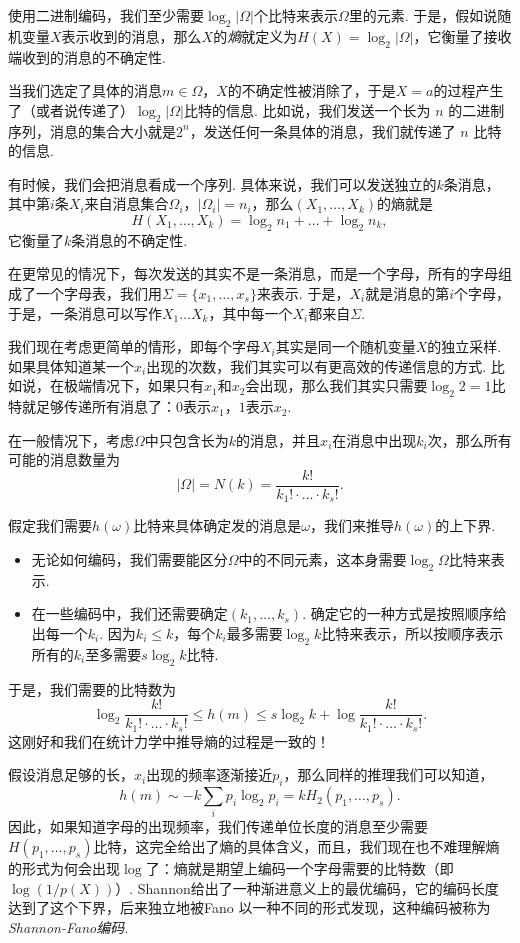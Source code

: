 使用二进制编码，我们至少需要$\log_2 |\Omega|$个比特来表示$\Omega$里的元素. 于是，假如说随机变量$X$表示收到的消息，那么$X$的\textit{熵}就定义为$H(X)=\log_2 |\Omega|$，它衡量了接收端收到的消息的不确定性. 

当我们选定了具体的消息$m\in \Omega$，$X$的不确定性被消除了，于是$X=a$的过程产生了（或者说传递了）$\log_2 |\Omega|$比特的信息. 比如说，我们发送一个长为 $n$ 的二进制序列，消息的集合大小就是$2^n$，发送任何一条具体的消息，我们就传递了 $n$ 比特的信息.

有时候，我们会把消息看成一个序列. 具体来说，我们可以发送独立的$k$条消息，其中第$i$条$X_i$来自消息集合$\Omega_i$，$|\Omega_i|=n_i$，那么$(X_1,\dots,X_k)$的熵就是
\[H(X_1,\dots,X_k)=\log_2 n_1+\dots+\log_2 n_k,\]
它衡量了$k$条消息的不确定性. 

在更常见的情况下，每次发送的其实不是一条消息，而是一个字母，所有的字母组成了一个字母表，我们用$\Sigma=\{x_1,\dots,x_s\}$来表示. 于是，$X_i$就是消息的第$i$个字母，于是，一条消息可以写作$X_1\dots X_k$，其中每一个$X_i$都来自$\Sigma$.

我们现在考虑更简单的情形，即每个字母$X_i$其实是同一个随机变量$X$的独立采样. 如果具体知道某一个$x_i$出现的次数，我们其实可以有更高效的传递信息的方式. 比如说，在极端情况下，如果只有$x_1$和$x_2$会出现，那么我们其实只需要$\log_2 2=1$比特就足够传递所有消息了：$0$表示$x_1$，$1$表示$x_2$.

在一般情况下，考虑$\Omega$中只包含长为$k$的消息，并且$x_i$在消息中出现$k_i$次，那么所有可能的消息数量为
\[|\Omega|=N(k)=\frac{k!}{k_1!\cdot\dots\cdot k_s!}.\]

假定我们需要$h(\omega)$比特来具体确定发的消息是$\omega$，我们来推导$h(\omega)$的上下界. 
\begin{itemize}
    \item 无论如何编码，我们需要能区分$\Omega$中的不同元素，这本身需要$\log_2\Omega$比特来表示. 
    \item 在一些编码中，我们还需要确定$(k_1,\dots,k_s)$. 确定它的一种方式是按照顺序给出每一个$k_i$. 因为$k_i\leq k$，每个$k_i$最多需要$\log_2 k$比特来表示，所以按顺序表示所有的$k_i$至多需要$s\log_2 k$比特.
\end{itemize}
于是，我们需要的比特数为
\[\log_2\frac{k!}{k_1!\cdot\dots\cdot k_s!}\leq h(m)\leq s\log_2k+\log\frac{k!}{k_1!\cdot\dots\cdot k_s!}.\]
这刚好和我们在统计力学中推导熵的过程是一致的！

假设消息足够的长，$x_i$出现的频率逐渐接近$p_i$，那么同样的推理我们可以知道，
\[h(m)\sim -k\sum_i p_i\log_2 p_i=kH_2(p_1,\dots,p_s).\]
因此，如果知道字母的出现频率，我们传递单位长度的消息至少需要$H(p_1,\dots,p_s)$比特，这完全给出了熵的具体含义，而且，我们现在也不难理解熵的形式为何会出现$\log$了：熵就是期望上编码一个字母需要的比特数（即$\log(1/p(X))$）. Shannon给出了一种渐进意义上的最优编码，它的编码长度达到了这个下界，后来独立地被Fano \cite{robertm.fanoTransmissionInformation1949} 以一种不同的形式发现，这种编码被称为\textit{Shannon-Fano编码}.

